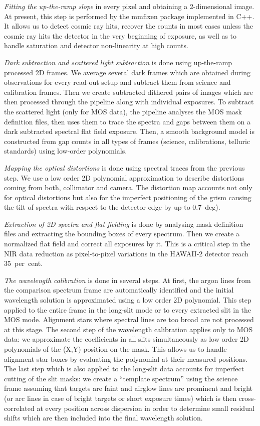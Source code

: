 \documentclass[11pt,twoside]{article}
\begin{document}
 \emph{Fitting the up-the-ramp slope} in every pixel and obtaining a
2-dimensional image. At present, this step is performed by the {\sc
mmfixen} package implemented in {\sc C++}. It allows us to detect cosmic ray
hits, recover the counts in most cases unless the cosmic ray hits the
detector in the very beginning of exposure, as well as to handle saturation
and detector non-linearity at high counts.

 \emph{Dark subtraction and scattered light subtraction} is done using
up-the-ramp processed 2D frames.  We average several dark frames which are
obtained during observations for every read-out setup and subtract them from
science and calibration frames.  Then we create subtracted dithered pairs of
images which are then processed through the pipeline along with individual
exposures.  To subtract the scattered light (only for MOS data), the
pipeline analyses the MOS mask definition files, then uses them to trace the
spectra and gaps between them on a dark subtracted spectral flat field
exposure.  Then, a smooth background model is constructed from gap counts in
all types of frames (science, calibrations, telluric standards) using
low-order polynomials.

 \emph{Mapping the optical distortions} is done using spectral traces
from the previous step.  We use a low order 2D polynomial approximation to
describe distortions coming from both, collimator and camera. The distortion
map accounts not only for optical distortions but also for the imperfect
positioning of the grism causing the tilt of spectra with respect to the
detector edge by up-to 0.7~deg).

 \emph{Extraction of 2D spectra and flat fielding} is done by analysing mask
definition files and extracting the bounding boxes of every spectrum.  Then
we create a normalized flat field and correct all exposures by it.  This is
a critical step in the NIR data reduction as pixel-to-pixel variations
in the HAWAII-2 detector reach 35~per~cent.

 \emph{The wavelength calibration} is done in several steps. At first,
the argon lines from the comparison spectrum frame are automatically
identified and the initial wavelength solution is approximated using a low
order 2D polynomial.  This step applied to the entire frame in the long-slit
mode or to every extracted slit in the MOS mode.  Alignment stars where
spectral lines are too broad are not processed at this stage.  The second
step of the wavelength calibration applies only to MOS data: we approximate
the coefficients in all slits simultaneously as low order 2D polynomials of
the (X,Y) position on the mask.  This allows us to handle alignment star
boxes by evaluating the polynomial at their measured positions.  The last
step which is also applied to the long-slit data accounts for imperfect
cutting of the slit masks: we create a ``template spectrum'' using the
science frame assuming that targets are faint and airglow lines are
prominent and bright (or arc lines in case of bright targets or short
exposure times) which is then cross-correlated at every position across
dispersion in order to determine small residual shifts which are then
included into the final wavelength solution.
\end{document}
